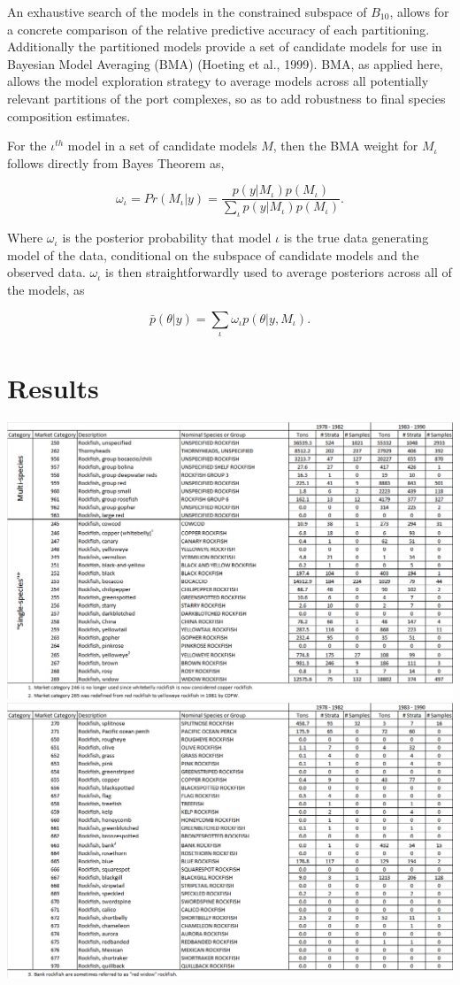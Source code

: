 \documentclass[12pt]{article}
\begin{document}
An exhaustive search of the models in the constrained subspace of
\(B_{10}\), allows for a concrete comparison of the relative predictive
accuracy of each partitioning. Additionally the partitioned models
provide a set of candidate models for use in Bayesian Model Averaging
(BMA) (Hoeting et al., 1999). BMA, as applied here, allows the model
exploration strategy to average models across all potentially relevant
partitions of the port complexes, so as to add robustness to final
species composition estimates.

For the \(\iota^{th}\) model in a set of candidate models \(M\), then
the BMA weight for \(M_\iota\) follows directly from Bayes Theorem as,

\[\omega_\iota = Pr(M_\iota|y) = \frac{ p(y|M_\iota)p(M_\iota) }{ \sum_\iota p(y|M_\iota)p(M_\iota) }.\]

Where \(\omega_\iota\) is the posterior probability that model \(\iota\)
is the true data generating model of the data, conditional on the
subspace of candidate models and the observed data. \(\omega_\iota\) is
then straightforwardly used to average posteriors across all of the
models, as

\[\bar p(\theta|y) = \sum_{\iota} \omega_\iota p(\theta|y, M_\iota).\]

\section{Results}\label{results}

\includegraphics[width=\textwidth]{./pictures/MC_summary_table_part_1.png}
\includegraphics[width=\textwidth]{./pictures/MC_summary_table_part_2.png}
\end{document}

